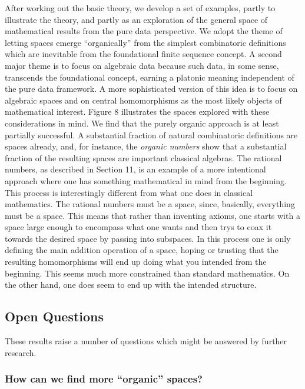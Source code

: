 \documentclass[11pt]{article}
\begin{document}
     After working out the basic theory, we develop a set of examples, partly to illustrate the theory, and partly as an exploration of the general 
space of mathematical results from the pure data perspective.  We adopt the theme of letting spaces emerge ``organically'' from the simplest 
combinatoric definitions which are inevitable from the foundational finite sequence concept.  
A second major theme is to focus on algebraic data because such data, in some sense, transcends 
the foundational concept, earning a platonic meaning independent of the pure data framework.  A more 
sophisticated version of this idea is to focus on algebraic spaces and on central homomorphisms as the most likely objects 
of mathematical interest. 
Figure 8 illustrates the spaces explored with these considerations in mind.  
We find that the purely organic approach is at least partially successful.  A substantial fraction of natural combinatoric definitions are 
spaces already, and, for instance, the {\it organic numbers} show that a substantial fraction of the resulting spaces are important classical algebras.  
The rational numbers, as described in Section 11, is an example of a more intentional approach where one has something mathematical
in mind from the beginning.  This process is interestingly different from what one does in classical mathematics.  The rational numbers 
must be a space, since, basically, everything must be a space.  This means that rather than inventing axioms, one starts with a space 
large enough to encompass what one wants and then trys to coax it towards the desired space by passing into subspaces.  In this 
process one is only defining the main addition operation of a space, hoping or trusting that the resulting homomorphisms will end up 
doing what you intended from the beginning.  This seems much more constrained than standard mathematics.  On the other hand, 
one does seem to end up with the intended structure.  

\subsection{Open Questions}

These results raise a number of questions which might be answered by further research.  

\subsubsection{How can we find more ``organic'' spaces?}
\end{document}
